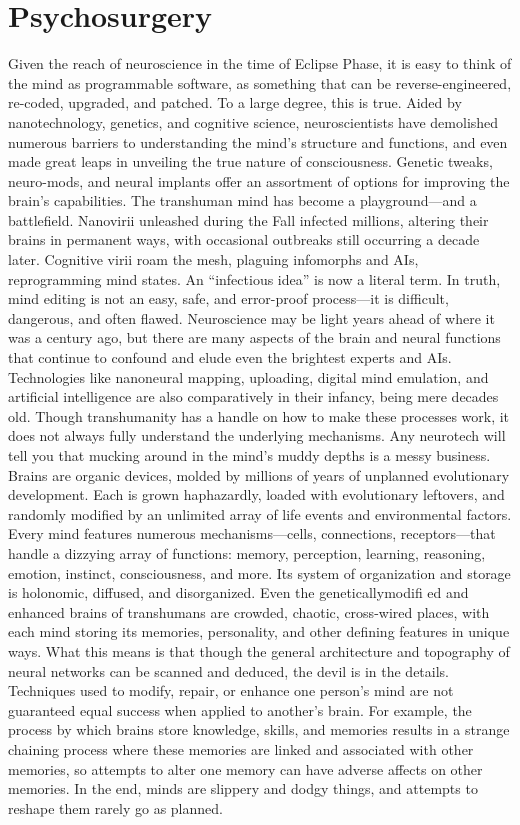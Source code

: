 \section{Psychosurgery}
Given the reach of neuroscience in the time of
Eclipse Phase, it is easy to think of the mind as
programmable software, as something that can be
reverse-engineered, re-coded, upgraded, and patched.
To a large degree, this is true. Aided by nanotechnology,
genetics, and cognitive science, neuroscientists
have demolished numerous barriers to understanding
the mind’s structure and functions, and even
made great leaps in unveiling the true nature of
consciousness. Genetic tweaks, neuro-mods, and
neural implants offer an assortment of options for
improving the brain’s capabilities. The transhuman
mind has become a playground—and a battlefield.
Nanovirii unleashed during the Fall infected millions,
altering their brains in permanent ways, with
occasional outbreaks still occurring a decade later.
Cognitive virii roam the mesh, plaguing infomorphs
and AIs, reprogramming mind states. An “infectious
idea” is now a literal term.
In truth, mind editing is not an easy, safe, and
error-proof process—it is difficult, dangerous, and
often flawed. Neuroscience may be light years
ahead of where it was a century ago, but there are
many aspects of the brain and neural functions
that continue to confound and elude even the
brightest experts and AIs. Technologies like nanoneural
mapping, uploading, digital mind emulation,
and artificial intelligence are also comparatively
in their infancy, being mere decades old. Though
transhumanity has a handle on how to make these
processes work, it does not always fully understand
the underlying mechanisms.
Any neurotech will tell you that mucking around
in the mind’s muddy depths is a messy business.
Brains are organic devices, molded by millions of
years of unplanned evolutionary development. Each
is grown haphazardly, loaded with evolutionary
leftovers, and randomly modified by an unlimited
array of life events and environmental factors. Every
mind features numerous mechanisms—cells, connections,
receptors—that handle a dizzying array
of functions: memory, perception, learning, reasoning,
emotion, instinct, consciousness, and more. Its
system of organization and storage is holonomic,
diffused, and disorganized. Even the geneticallymodifi
ed and enhanced brains of transhumans are
crowded, chaotic, cross-wired places, with each
mind storing its memories, personality, and other
defining features in unique ways.
What this means is that though the general architecture
and topography of neural networks can
be scanned and deduced, the devil is in the details.
Techniques used to modify, repair, or enhance one
person’s mind are not guaranteed equal success
when applied to another’s brain. For example, the
process by which brains store knowledge, skills, and
memories results in a strange chaining process where
these memories are linked and associated with other
memories, so attempts to alter one memory can
have adverse affects on other memories. In the end,
minds are slippery and dodgy things, and attempts
to reshape them rarely go as planned.

